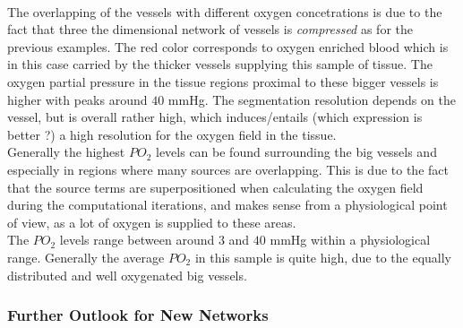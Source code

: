 \\The overlapping of the vessels with different oxygen concetrations is due to the fact that three the dimensional network of vessels is \emph{compressed} as for the previous examples. The red color corresponds to oxygen enriched blood which is in this case carried by the thicker vessels supplying this sample of tissue. The oxygen partial pressure in the tissue regions proximal to these bigger vessels is higher with peaks around $40$ mmHg. The segmentation resolution depends on the vessel, but is overall rather high, which induces/entails {\color{red} (which expression is better ?)} a high resolution for the oxygen field in the tissue.
\\Generally the highest $PO_2$ levels can be found surrounding the big vessels and especially in regions where many sources are overlapping. This is due to the fact that the source terms are superpositioned when calculating the oxygen field during the computational iterations, and makes sense from a physiological point of view, as a lot of oxygen is supplied to these areas.
\\The $PO_2$ levels range between around $3$ and $40$ mmHg within a physiological range. Generally the average $PO_2$ in this sample is quite high, due to the equally distributed and well oxygenated big vessels.

\newpage
\subsubsection*{Further Outlook for New Networks}

